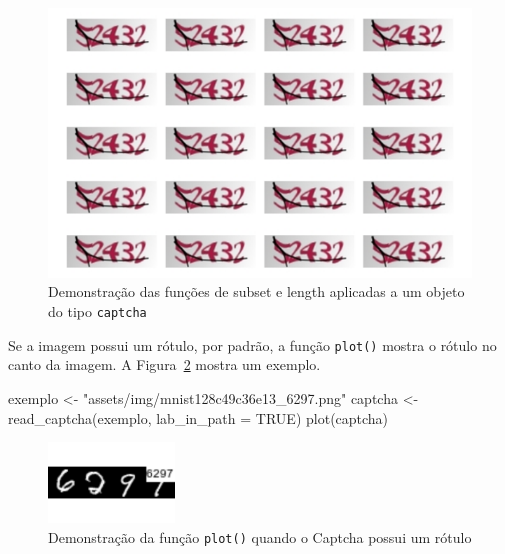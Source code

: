 \documentclass[12pt,twoside,brazilian]{book}
\newenvironment{Shaded}{\begin{snugshade}}{\end{snugshade}}
\newcommand{\AttributeTok}[1]{\textcolor[rgb]{0.40,0.45,0.13}{#1}}
\newcommand{\ConstantTok}[1]{\textcolor[rgb]{0.56,0.35,0.01}{#1}}
\newcommand{\FunctionTok}[1]{\textcolor[rgb]{0.28,0.35,0.67}{#1}}
\newcommand{\NormalTok}[1]{\textcolor[rgb]{0.00,0.23,0.31}{#1}}
\newcommand{\OtherTok}[1]{\textcolor[rgb]{0.00,0.23,0.31}{#1}}
\newcommand{\StringTok}[1]{\textcolor[rgb]{0.13,0.47,0.30}{#1}}
\begin{document}
\begin{figure}[H]

{\centering \includegraphics{./resultados_files/figure-pdf/fig-exemplo-plot-multi-varias-subset-1.pdf}

}

\caption{\label{fig-exemplo-plot-multi-varias-subset}Demonstração das
funções de subset e length aplicadas a um objeto do tipo
\texttt{captcha}}

\end{figure}

Se a imagem possui um rótulo, por padrão, a função \texttt{plot()}
mostra o rótulo no canto da imagem. A
Figura~\ref{fig-exemplo-plot-rotulado} mostra um exemplo.

\begin{Shaded}
\begin{Highlighting}[]
\NormalTok{exemplo }\OtherTok{\textless{}{-}} \StringTok{"assets/img/mnist128c49c36e13\_6297.png"}
\NormalTok{captcha }\OtherTok{\textless{}{-}} \FunctionTok{read\_captcha}\NormalTok{(exemplo, }\AttributeTok{lab\_in\_path =} \ConstantTok{TRUE}\NormalTok{)}
\FunctionTok{plot}\NormalTok{(captcha)}
\end{Highlighting}
\end{Shaded}

\begin{figure}[H]

{\centering \includegraphics[width=0.3\textwidth,height=\textheight]{./resultados_files/figure-pdf/fig-exemplo-plot-rotulado-1.pdf}

}

\caption{\label{fig-exemplo-plot-rotulado}Demonstração da função
\texttt{plot()} quando o Captcha possui um rótulo}

\end{figure}
\end{document}
